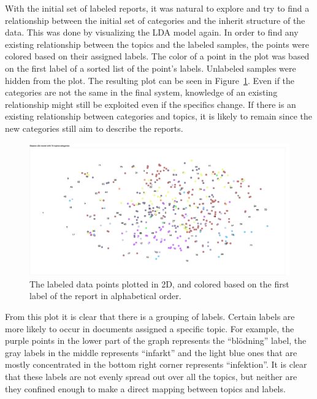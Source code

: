 With the initial set of labeled reports, it was natural to explore and try to find a relationship between the initial set of categories and the inherit structure of the data.
This was done by visualizing the LDA model again.
In order to find any existing relationship between the topics and the labeled samples, the points were colored based on their assigned labels.
The color of a point in the plot was based on the first label of a sorted list of the point's labels.
Unlabeled samples were hidden from the plot.
The resulting plot can be seen in Figure~\ref{fig:categories-lda-75}.
Even if the categories are not the same in the final system, knowledge of an existing relationship might still be exploited even if the specifics change.
If there is an existing relationship between categories and topics, it is likely to remain since the new categories still aim to describe the reports.

\begin{figure}
    \centering
    \includegraphics[width=\textwidth]{figures/categories-lda-75.png}
    \caption{The labeled data points plotted in 2D, and colored based on the first label of the report in alphabetical order.}
    \label{fig:categories-lda-75}
\end{figure}

From this plot it is clear that there is a grouping of labels.
Certain labels are more likely to occur in documents assigned a specific topic.
For example, the purple points in the lower part of the graph represents the ``blödning'' label, the gray labels in the middle represents ``infarkt'' and the light blue ones that are mostly concentrated in the bottom right corner represents ``infektion''.
It is clear that these labels are not evenly spread out over all the topics, but neither are they confined enough to make a direct mapping between topics and labels.

